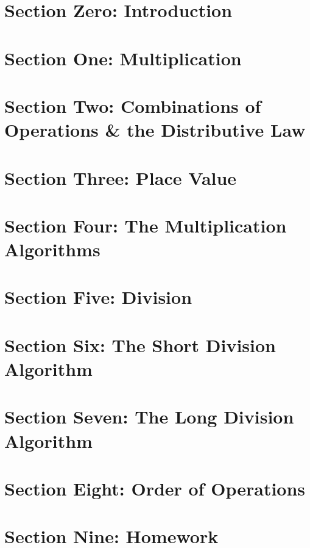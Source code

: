 \section{Section Zero: Introduction}
    
    \setcounter{sec0marks}{\thesecmarks}

\section{Section One: Multiplication}
    
    \setcounter{sec1marks}{\thesecmarks}

\section{Section Two: Combinations of Operations \& the Distributive Law}
    
    \setcounter{sec2marks}{\thesecmarks}

\section{Section Three: Place Value}
    
    \setcounter{sec3marks}{\thesecmarks}

\section{Section Four: The Multiplication Algorithms}
    
    \setcounter{sec4marks}{\thesecmarks}

\section{Section Five: Division}
    
    \setcounter{sec5marks}{\thesecmarks}

\section{Section Six: The Short Division Algorithm}
    
    \setcounter{sec6marks}{\thesecmarks}

\section{Section Seven: The Long Division Algorithm}
    
    \setcounter{sec7marks}{\thesecmarks}

\section{Section Eight: Order of Operations}
    
    \setcounter{sec8marks}{\thesecmarks}

\section{Section Nine: Homework}
    
    \setcounter{hwmarks}{\thesecmarks}
